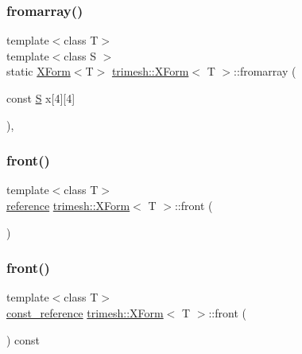 \subsubsection{\texorpdfstring{fromarray()}{fromarray()}\hspace{0.1cm}{\footnotesize\ttfamily [2/2]}}
{\footnotesize\ttfamily template$<$class T$>$ \\
template$<$class S $>$ \\
static \hyperlink{classtrimesh_1_1XForm}{X\+Form}$<$T$>$ \hyperlink{classtrimesh_1_1XForm}{trimesh\+::\+X\+Form}$<$ T $>$\+::fromarray (\begin{DoxyParamCaption}\item[{const \hyperlink{ego_8cc_abde73cd36321648268fb4543509b996a}{S}}]{x\mbox{[}4\mbox{]}\mbox{[}4\mbox{]} }\end{DoxyParamCaption})\hspace{0.3cm}{\ttfamily [inline]}, {\ttfamily [static]}}

\mbox{\label{classtrimesh_1_1XForm_af90a50637f3aa3dfc2a089cfb389ad8d}} 
\subsubsection{\texorpdfstring{front()}{front()}\hspace{0.1cm}{\footnotesize\ttfamily [1/2]}}
{\footnotesize\ttfamily template$<$class T$>$ \\
\hyperlink{classtrimesh_1_1XForm_afef5285ff7d9ea2e25a4bb4d966bd674}{reference} \hyperlink{classtrimesh_1_1XForm}{trimesh\+::\+X\+Form}$<$ T $>$\+::front (\begin{DoxyParamCaption}{ }\end{DoxyParamCaption})\hspace{0.3cm}{\ttfamily [inline]}}

\mbox{\label{classtrimesh_1_1XForm_a804eb68232a117ad43bfd0257a7dda82}} 
\subsubsection{\texorpdfstring{front()}{front()}\hspace{0.1cm}{\footnotesize\ttfamily [2/2]}}
{\footnotesize\ttfamily template$<$class T$>$ \\
\hyperlink{classtrimesh_1_1XForm_a33bd450d8902f70aaf7d4bf9fec01502}{const\+\_\+reference} \hyperlink{classtrimesh_1_1XForm}{trimesh\+::\+X\+Form}$<$ T $>$\+::front (\begin{DoxyParamCaption}{ }\end{DoxyParamCaption}) const\hspace{0.3cm}{\ttfamily [inline]}}

